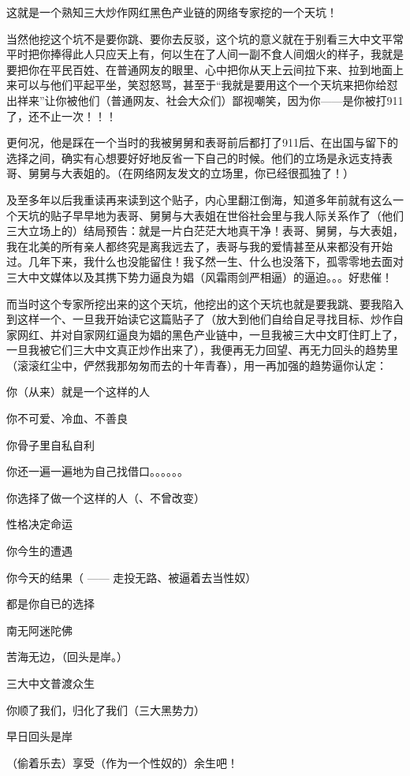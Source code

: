 \documentclass[9pt, b5paper]{article}
\begin{document}
这就是一个熟知三大炒作网红黑色产业链的网络专家挖的一个天坑！

当然他挖这个坑不是要你跳、要你去反驳，这个坑的意义就在于别看三大中文平常平时把你捧得此人只应天上有，何以生在了人间一副不食人间烟火的样子，我就是要把你在平民百姓、在普通网友的眼里、心中把你从天上云间拉下来、拉到地面上来可以与他们平起平坐，笑怼怒骂，甚至于“我就是要用这个一个天坑来把你给怼出祥来”让你被他们（普通网友、社会大众们）鄙视嘲笑，因为你——是你被打911了，还不止一次！！！

更何况，他是踩在一个当时的我被舅舅和表哥前后都打了911后、在出国与留下的选择之间，确实有心想要好好地反省一下自己的时候。他们的立场是永远支持表哥、舅舅与大表姐的。（在网络网友发文的立场里，你已经很孤独了！）

及至多年以后我重读再来读到这个贴子，内心里翻江倒海，知道多年前就有这么一个天坑的贴子早早地为表哥、舅舅与大表姐在世俗社会里与我人际关系作了（他们三大立场上的）结局预告：就是一片白茫茫大地真干净！表哥、舅舅，与大表姐，我在北美的所有亲人都终究是离我远去了，表哥与我的爱情甚至从来都没有开始过。几年下来，我什么也没能留住！我孓然一生、什么也没落下，孤零零地去面对三大中文媒体以及其携下势力逼良为娼（风霜雨剑严相逼）的逼迫。。。好悲催！

而当时这个专家所挖出来的这个天坑，他挖出的这个天坑也就是要我跳、要我陷入到这样一个、一旦我开始读它这篇贴子了（放大到他们自给自足寻找目标、炒作自家网红、并对自家网红逼良为娼的黑色产业链中，一旦我被三大中文盯住盯上了，一旦我被它们三大中文真正炒作出来了），我便再无力回望、再无力回头的趋势里（滚滚红尘中，俨然我那匆匆而去的十年青春），用一再加强的趋势逼你认定：

你（从来）就是一个这样的人

你不可爱、冷血、不善良

你骨子里自私自利

你还一遍一遍地为自己找借口。。。。。。

你选择了做一个这样的人（、不曾改变）

性格决定命运

你今生的遭遇

你今天的结果（ —— 走投无路、被逼着去当性奴）

都是你自已的选择

南无阿迷陀佛

苦海无边，（回头是岸。）

三大中文普渡众生

你顺了我们，归化了我们（三大黑势力）

早日回头是岸

（偷着乐去）享受（作为一个性奴的）余生吧！
\end{document}
